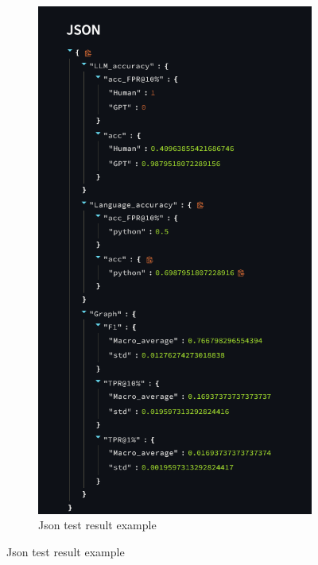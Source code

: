 \begin{figure}[H]
\begin{subfigure}[t]{0.45\textwidth}
        \includegraphics[width=\linewidth]{img/interfaccia/Screenshot 2025-09-27 173032.png}
        \caption{Json test result example}
        \label{fig:ab2sceyg}
    \end{subfigure}
\end{figure}

